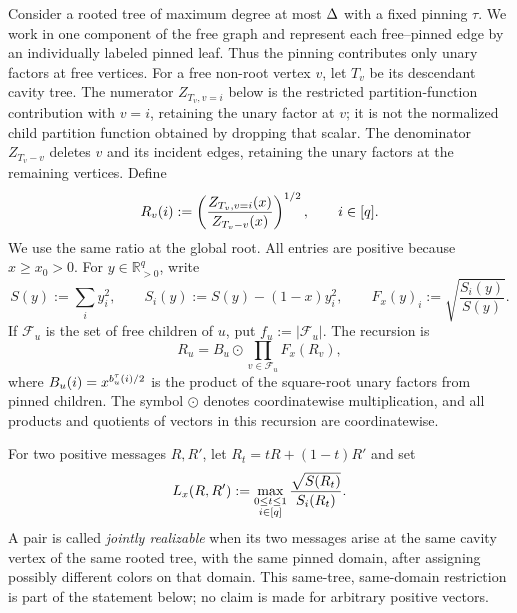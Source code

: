 Consider a rooted tree of maximum degree at most \(\Delta\) with a fixed
pinning \(\tau\).  We work in one component of
the free graph and represent each free--pinned edge by an individually
labeled pinned leaf.  Thus the pinning contributes only unary factors at
free vertices.  For a free non-root vertex \(v\), let \(T_v\) be its
descendant cavity tree.  The numerator \(Z_{T_v,v=i}\) below is the
restricted partition-function contribution with \(v=i\), retaining the
unary factor at \(v\); it is not the normalized child partition function
obtained by dropping that scalar.  The denominator \(Z_{T_v-v}\) deletes
\(v\) and its incident edges, retaining the unary factors at the remaining
vertices.  Define
\begin{equation}
 R_v(i):=\left(
   \frac{Z_{T_v,v=i}(x)}{Z_{T_v-v}(x)}
 \right)^{1/2},
 \qquad i\in[q].
 \label{eq:bbr-message}
\end{equation}
We use the same ratio at the global root.
All entries are positive because \(x\ge x_0>0\).  For
\(y\in\mathbb R_{>0}^q\), write
\begin{equation}
 S(y):=\sum_i y_i^2,\qquad
 S_i(y):=S(y)-(1-x)y_i^2,\qquad
 F_x(y)_i:=\sqrt{\frac{S_i(y)}{S(y)}}.
 \label{eq:bbr-local-map}
\end{equation}
If \(\mathcal F_u\) is the set of free children of \(u\), put
\(f_u:=|\mathcal F_u|\).  The recursion is
\begin{equation}
 R_u=B_u\odot\prod_{v\in\mathcal F_u}F_x(R_v),
 \label{eq:bbr-recursion}
\end{equation}
where \(B_u(i)=x^{b_u^\tau(i)/2}\) is the product of the
square-root unary factors from pinned children.  The symbol
$\odot$ denotes coordinatewise multiplication, and all products and
quotients of vectors in this recursion are coordinatewise.

For two positive messages \(R,R'\), let \(R_t=tR+(1-t)R'\) and set
\begin{equation}
 L_x(R,R'):=
 \max_{\substack{0\le t\le1\\ i\in[q]}}
 \frac{\sqrt{S(R_t)}}{S_i(R_t)}.
 \label{eq:bbr-segment-weight}
\end{equation}
A pair is called \emph{jointly realizable} when its two messages arise at
the same cavity vertex of the same rooted tree, with the same pinned
domain, after assigning possibly different colors on that domain.  This
same-tree, same-domain restriction is part of the statement below; no
claim is made for arbitrary positive vectors.

